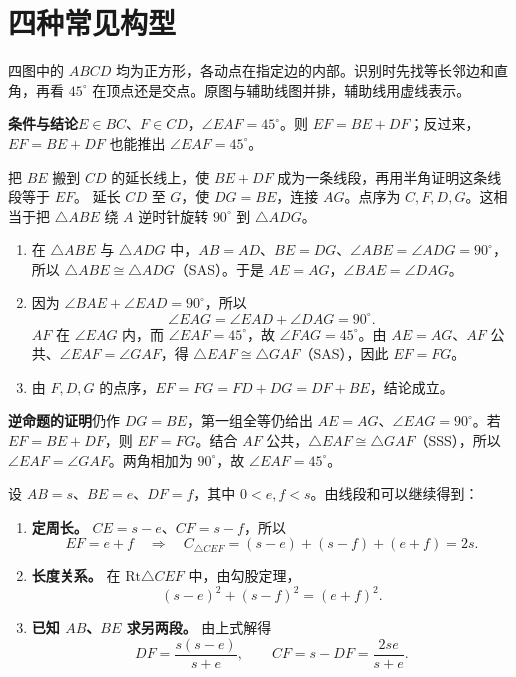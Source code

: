 \setcounter{section}{0}
\section*{四种常见构型}
{}
四图中的 \(ABCD\) 均为正方形，各动点在指定边的内部。识别时先找等长邻边和直角，再看 \(45^\circ\) 在顶点还是交点。原图与辅助线图并排，辅助线用虚线表示。

\textbf{条件与结论}\quad \(E\in BC\)、\(F\in CD\)，\(\angle EAF=45^\circ\)。则 \(EF=BE+DF\)；反过来，\(EF=BE+DF\) 也能推出 \(\angle EAF=45^\circ\)。
\diagram{\figIntroA\hspace{1.2cm}\figIntroASolve}

\think 把 \(BE\) 搬到 \(CD\) 的延长线上，使 \(BE+DF\) 成为一条线段，再用半角证明这条线段等于 \(EF\)。
\solve 延长 \(CD\) 至 \(G\)，使 \(DG=BE\)，连接 \(AG\)。点序为 \(C,F,D,G\)。这相当于把 \(\triangle ABE\) 绕 \(A\) 逆时针旋转 \(90^\circ\) 到 \(\triangle ADG\)。
\begin{enumerate}
\item 在 \(\triangle ABE\) 与 \(\triangle ADG\) 中，\(AB=AD\)、\(BE=DG\)、\(\angle ABE=\angle ADG=90^\circ\)，所以 \(\triangle ABE\cong\triangle ADG\)（SAS）。于是 \(AE=AG\)，\(\angle BAE=\angle DAG\)。
\item 因为 \(\angle BAE+\angle EAD=90^\circ\)，所以
\[
\angle EAG=\angle EAD+\angle DAG=90^\circ.
\]
\(AF\) 在 \(\angle EAG\) 内，而 \(\angle EAF=45^\circ\)，故 \(\angle FAG=45^\circ\)。由 \(AE=AG\)、\(AF\) 公共、\(\angle EAF=\angle GAF\)，得 \(\triangle EAF\cong\triangle GAF\)（SAS），因此 \(EF=FG\)。
\item 由 \(F,D,G\) 的点序，\(EF=FG=FD+DG=DF+BE\)，结论成立。
\end{enumerate}

\clearpage
{}
\textbf{逆命题的证明}\quad 仍作 \(DG=BE\)，第一组全等仍给出 \(AE=AG\)、\(\angle EAG=90^\circ\)。若 \(EF=BE+DF\)，则 \(EF=FG\)。结合 \(AF\) 公共，\(\triangle EAF\cong\triangle GAF\)（SSS），所以 \(\angle EAF=\angle GAF\)。两角相加为 \(90^\circ\)，故 \(\angle EAF=45^\circ\)。

设 \(AB=s\)、\(BE=e\)、\(DF=f\)，其中 \(0<e,f<s\)。由线段和可以继续得到：
\begin{enumerate}
\item \textbf{定周长。} \(CE=s-e\)、\(CF=s-f\)，所以
\[
EF=e+f\quad\Longrightarrow\quad
C_{\triangle CEF}=(s-e)+(s-f)+(e+f)=2s.
\]
\item \textbf{长度关系。} 在 \(\mathrm{Rt}\triangle CEF\) 中，由勾股定理，
\[
(s-e)^2+(s-f)^2=(e+f)^2.
\]
\item \textbf{已知 \(AB\)、\(BE\) 求另两段。} 由上式解得
\[
\boxed{DF=\frac{s(s-e)}{s+e}},\qquad
\boxed{CF=s-DF=\frac{2se}{s+e}}.
\]
\end{enumerate}

